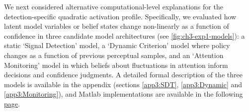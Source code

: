\documentclass[12pt,twoside]{reedthesis}
\begin{document}
We next considered alternative computational-level explanations for the detection-specific quadratic activation profile. Specifically, we evaluated how latent model variables or belief states change non-linearly as a function of confidence in three candidate model architectures (see \ref{fig:ch3-exp1-models}): a static `Signal Detection' model, a `Dynamic Criterion' model where policy changes as a function of previous perceptual samples, and an `Attention Monitoring' model in which beliefs about fluctuations in attention inform decisions and confidence judgments. A detailed formal description of the three models is available in the appendix (sections \ref{app3:SDT}, \ref{app3:Dynamic} and \ref{app3:Monitoring}), and Matlab implementations are available in the following \href{https://github.com/matanmazor/detectionVsDiscrimination_fMRI/blob/master/simulation/simulations.mlx}{page}.
\end{document}
